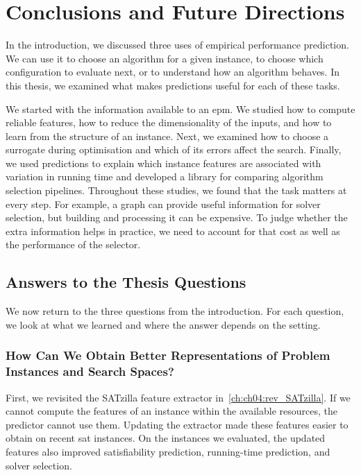 \chapter{Conclusions and Future Directions}
\label{ch:ch12:conclusions}

In the introduction, we discussed three uses of empirical performance prediction. We can use it to choose an algorithm for a given instance, to choose which configuration to evaluate next, or to understand how an algorithm behaves. In this thesis, we examined what makes predictions useful for each of these tasks.

We started with the information available to an \gls{epm}. We studied how to compute reliable features, how to reduce the dimensionality of the inputs, and how to learn from the structure of an instance. Next, we examined how to choose a surrogate during optimisation and which of its errors affect the search. Finally, we used predictions to explain which instance features are associated with variation in running time and developed a library for comparing algorithm selection pipelines. Throughout these studies, we found that the task matters at every step. For example, a graph can provide useful information for solver selection, but building and processing it can be expensive. To judge whether the extra information helps in practice, we need to account for that cost as well as the performance of the selector.

\section{Answers to the Thesis Questions}
\label{sec:ch12:answers}

We now return to the three questions from the introduction. For each question, we look at what we learned and where the answer depends on the setting.

\subsection{How Can We Obtain Better Representations of Problem Instances and Search Spaces?}

First, we revisited the SATzilla feature extractor in~\cref{ch:ch04:rev_SATzilla}. If we cannot compute the features of an instance within the available resources, the predictor cannot use them. Updating the extractor made these features easier to obtain on recent \gls{sat} instances. On the instances we evaluated, the updated features also improved satisfiability prediction, running-time prediction, and solver selection.

